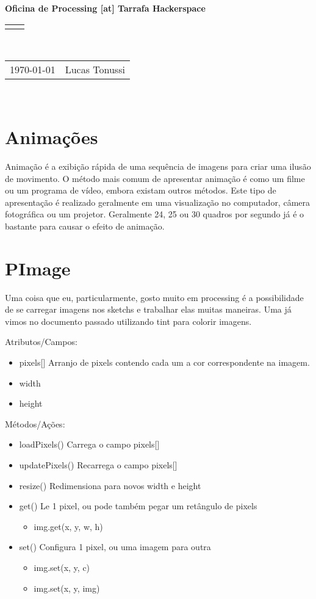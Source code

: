 \documentclass[12pt]{article}
\renewcommand{\title}[1]{\textbf{#1}\\}
\renewcommand{\line}{\begin{tabularx}{\textwidth}{X>{\raggedleft}X}\hline\\\end{tabularx}\\[-0.5cm]}
\newcommand{\leftright}[2]{\begin{tabularx}{\textwidth}{X>{\raggedleft}X}#1%
& #2\\\end{tabularx}\\[-0.5cm]}
\begin{document}
\title{Oficina de Processing [at] Tarrafa Hackerspace}
\line
\leftright{\today}{Lucas Tonussi}

\section{Animações}

\qquad Animação é a exibição rápida de uma sequência de imagens para criar uma ilusão de movimento. O método mais comum de apresentar animação é como um filme ou um programa de vídeo, embora existam outros métodos. Este tipo de apresentação é realizado geralmente em uma visualização no computador, câmera fotográfica ou um projetor. Geralmente 24, 25 ou 30 quadros por segundo já é o bastante para causar o efeito de animação.

\section{PImage}

\qquad Uma coisa que eu, particularmente, gosto muito em processing é a possibilidade de se carregar imagens nos sketchs e trabalhar elas muitas maneiras. Uma já vimos no documento passado utilizando tint para colorir imagens.

Atributos/Campos:

\begin{itemize}
\item pixels[] 	Arranjo de pixels contendo cada um a cor correspondente na imagem.
\item width
\item height
\end{itemize}

Métodos/Ações:
\begin{itemize}
\item loadPixels() 	Carrega o campo pixels[]
\item updatePixels() 	Recarrega o campo pixels[]
\item resize() Redimensiona para novos width e height
\item get() Le 1 pixel, ou pode também pegar um retângulo de pixels
\begin{itemize}
\item img.get(x, y, w, h)
\end{itemize}
\item set() Configura 1 pixel, ou uma imagem para outra
\begin{itemize}
\item img.set(x, y, c)
\item img.set(x, y, img)
\end{itemize}
\end{itemize}
\end{document}
